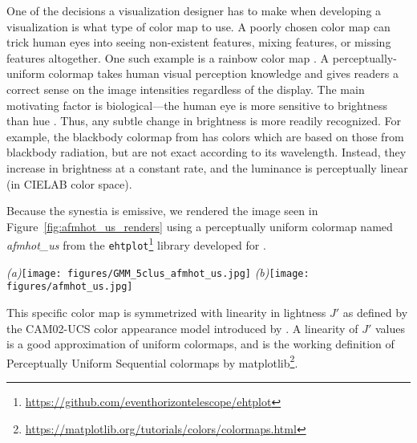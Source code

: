 \documentclass[fleqn,usenatbib,useAMS]{mnras}
\begin{document}
One of the decisions a visualization designer has to make when developing a visualization is what type of color map to use. A poorly chosen color map can trick human eyes into seeing non-existent features, mixing features, or missing features altogether. One such example is a rainbow color map \citep{Borland07, Moreland16}. A perceptually-uniform colormap takes human visual perception knowledge and gives readers a correct sense on the image intensities regardless of the display. The main motivating factor is biological---the human eye is more sensitive to brightness than hue \citep{Borkiewicz19a}. Thus, any subtle change in brightness is more readily recognized. For example, the blackbody colormap from \cite{Moreland16} has colors which are based on those from blackbody radiation, but are not exact according to its wavelength. Instead, they increase in brightness at a constant rate, and the luminance is perceptually linear (in CIELAB color space).


Because the synestia is emissive, we rendered the image seen in Figure~\ref{fig:afmhot_us_renders} using a perceptually uniform colormap named \textit{afmhot\_us} from the \texttt{ehtplot}\footnote{\url{https://github.com/eventhorizontelescope/ehtplot}} library developed for \cite{EHT19}. 
%
\begin{figure*}
 \begin{minipage}[c]{1.0\linewidth}
  \centering
  \begin{center}
  \textit{(a)}{\texttt{[image: figures/GMM\_5clus\_afmhot\_us.jpg]}}
  \textit{(b)}{\texttt{[image: figures/afmhot\_us.jpg]}}
  \caption{Same as Figure~\ref{fig:Estra_AVL_render}, except this applies the same perceptually uniform colormap used in the black hole imaging by the Event Horizon Telescope: \textit{afmhot\_us} \citep{EHT19}. \textit{(a)} uses the 5-cluster GMM results with the simplified \texttt{Estra} shader network, and \textit{(b)} uses the custom AVL shader without clustering.}
  \label{fig:afmhot_us_renders}
  \end{center}
  \end{minipage}
\end{figure*}
%
This specific color map is symmetrized with linearity in lightness $J'$ as defined by the CAM02-UCS color appearance model introduced by \cite{Luo06}. A linearity of $J'$ values is a good approximation of uniform colormaps, and is the working definition of Perceptually Uniform Sequential colormaps by matplotlib\footnote{\url{https://matplotlib.org/tutorials/colors/colormaps.html}}. \par
\end{document}
